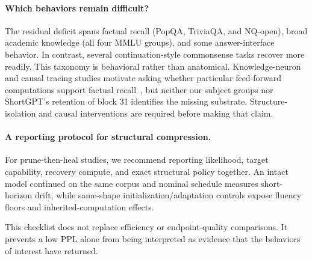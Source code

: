 \paragraph{Which behaviors remain difficult?}
The residual deficit spans factual recall (PopQA, TriviaQA, and NQ-open), broad
academic knowledge (all four MMLU groups), and some answer-interface behavior.
In contrast, several continuation-style commonsense tasks recover more readily.
This taxonomy is behavioral rather than anatomical. Knowledge-neuron and causal
tracing studies motivate asking whether particular feed-forward computations
support factual recall~\citep{dai2022knowledge,meng2022locating}, but neither our
subject groups nor ShortGPT's retention of block 31 identifies the missing
substrate. Structure-isolation and causal interventions are required before
making that claim.

\paragraph{A reporting protocol for structural compression.}
For prune-then-heal studies, we recommend reporting likelihood, target
capability, recovery compute, and exact structural policy together. An intact
model continued on the same corpus and nominal schedule measures short-horizon
drift, while same-shape
initialization/adaptation controls expose fluency floors and inherited-computation
effects.

\begin{center}
\end{center}

This checklist does not replace efficiency or endpoint-quality comparisons. It
prevents a low PPL alone from being interpreted as evidence that the behaviors
of interest have returned.
